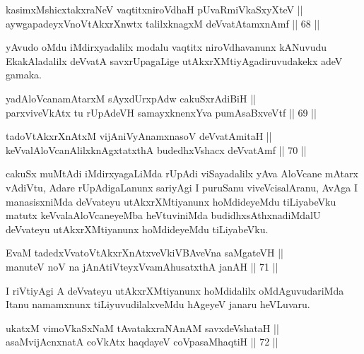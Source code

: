
\begin{shl}
kasimxMshicxtakxraNeV vaqtitxniroVdhaH pUvaRmiVkaSxyXteV || \\
aywgapadeyxVnoVtAkxrXnwtx talilxknagxM deVvatAtamxnAmf \hfill || 68 ||  
\end{shl}

\begin{artha}
yAvudo oMdu iMdirxyadalilx modalu vaqtitx niroVdhavanunx kANuvudu
EkakAladalilx deVvatA savxrUpagaLige utAkxrXMtiyAgadiruvudakekx adeV
gamaka.
\end{artha}

\begin{shl}
yadA\s \s loVcanamAtarxM sAyxdUrxpAdw cakuSxrAdiBiH || \\
parxviveVkAtx tu rUpAdeVH samayxknenxYva pumAsaBxveVtf \hfill || 69 ||  
\end{shl}

\begin{shl}
tadoVtAkxrXnAtxM vijAniVyAnamxnasoV deVvatAmitaH || \\
keVvalAloVcanAlilxknAgxtatxthA budedhxVshacx deVvatAmf \hfill || 70 ||  
\end{shl}

\begin{artha}
cakuSx muMtAdi iMdirxyagaLiMda rUpAdi viSayadalilx yAva AloVcane
mAtarx vAdiVtu, Adare rUpAdigaLanunx sariyAgi I puruSanu
viveVcisalAranu, AvAga I manasisxniMda deVvateyu utAkxrXMtiyanunx
hoMdideyeMdu tiLiyabeVku matutx keVvala\break AloVcaneyeMba heVtuviniMda
budidhxsAthxnadiMdalU deVvateyu utAkxrXMtiyanunx hoMdideyeMdu
tiLiyabeVku.
\end{artha}

\begin{shl}
EvaM tadedxVvatoVtAkxrXnAtxveVkiVBAveVna saMgateVH || \\
manuteV noV na jAnAtiVteyxVvamAhusatxthA janAH \hfill || 71 ||  
\end{shl}

\begin{artha}
I riVtiyAgi A deVvateyu utAkxrXMtiyanunx hoMdidalilx oMdAguvudariMda
Itanu namamxnunx tiLiyuvudilalxveMdu hAgeyeV janaru heVLuvaru.
\end{artha}

\begin{shl}
ukatxM vimoVkaSxNaM tAvatakxraNAnAM savxdeVshataH || \\
asaMvijAcnxnatA coVkAtx haqdayeV coVpasaMhaqtiH \hfill || 72 ||  
\end{shl}

